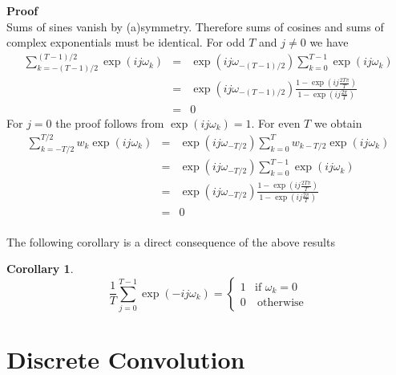 \documentclass[a4paper]{book}
\newtheorem{Corollary}{Corollary}
\begin{document}
\begin{appendix}
\textbf{Proof}\\
Sums of sines vanish by (a)symmetry. Therefore sums of cosines and sums of complex exponentials must be identical. For odd $T$ and $j\neq 0$ we have
\begin{eqnarray*}
\sum_{k=-(T-1)/2}^{(T-1)/2} \exp(ij\omega_k)&=&\exp\left(ij\omega_{-(T-1)/2}\right)\sum_{k=0}^{T-1} \exp\left(ij\omega_k\right)\\
&=&\exp\left(ij\omega_{-(T-1)/2}\right)\frac{1-\exp\left(ij\frac{2T\pi}{T}\right)}{1-\exp\left(ij\frac{2\pi}{T}\right)}\\
&=&0
\end{eqnarray*}
For $j=0$ the proof follows from $\exp(ij\omega_k)=1$. For even $T$ we obtain
\begin{eqnarray*}
\sum_{k=-T/2}^{T/2} w_k\exp(ij\omega_k)&=&\exp\left(ij\omega_{-T/2}\right)\sum_{k=0}^{T} w_{k-T/2}\exp\left(ij\omega_k\right)\\
&=&\exp\left(ij\omega_{-T/2}\right)\sum_{k=0}^{T-1} \exp\left(ij\omega_k\right)\\
&=&\exp\left(ij\omega_{-T/2}\right)\frac{1-\exp\left(ij\frac{2T\pi}{T}\right)}{1-\exp\left(ij\frac{2\pi}{T}\right)}\\
&=&0
\end{eqnarray*}
\\

The following corollary is a direct consequence of the above results
\begin{Corollary}\label{discret_sums_cor}
\[\frac{1}{T}\sum_{j=0}^{T-1}\exp(-ij\omega_k)=\left\{\begin{array}{cc}
1&\textrm{if~}\omega_k=0\\0&~\textrm{otherwise}\end{array}\right.\]
\end{Corollary}


\section{Discrete Convolution}\label{dis_con_app}




\end{appendix}
\end{document}
